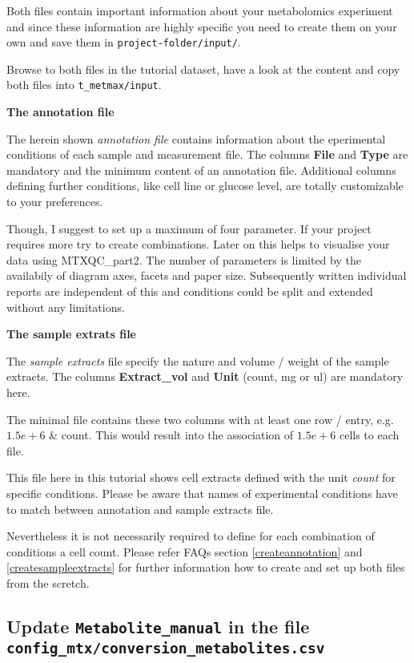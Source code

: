 \documentclass[]{book}
\begin{document}
Both files contain important information about your metabolomics experiment and since these information are highly specific you need to create them on your own and save them in \texttt{project-folder/input/}.

Browse to both files in the tutorial dataset, have a look at the content and copy both files into \texttt{t\_metmax/input}.

\textbf{The annotation file}

The herein shown \emph{annotation file} contains information about the eperimental conditions of each sample and measurement file. The columns \textbf{File} and \textbf{Type} are mandatory and the minimum content of an annotation file. Additional columns defining further conditions, like cell line or glucose level, are totally customizable to your preferences.

Though, I suggest to set up a maximum of four parameter. If your project requires more try to create combinations. Later on this helps to visualise your data using MTXQC\_part2. The number of parameters is limited by the availabily of diagram axes, facets and paper size. Subsequently written individual reports are independent of this and conditions could be split and extended without any limitations.

\textbf{The sample extrats file}

The \emph{sample extracts} file specify the nature and volume / weight of the sample extracts. The columns \textbf{Extract\_vol} and \textbf{Unit} (count, mg or ul) are mandatory here.

The minimal file contains these two columns with at least one row / entry, e.g. \(1.5e+6\) \& count. This would result into the association of \(1.5e+6\) cells to each file.

This file here in this tutorial shows cell extracts defined with the unit \emph{count} for specific conditions. Please be aware that names of experimental conditions have to match between annotation and sample extracts file.

Nevertheless it is not necessarily required to define for each combination of conditions a cell count. Please refer FAQs section \ref{createannotation} and \ref{createsampleextracts} for further information how to create and set up both files from the scretch.

\hypertarget{update-metabolite_manual-in-the-file-config_mtxconversion_metabolites.csv}{%
\subsection{\texorpdfstring{Update \texttt{Metabolite\_manual} in the file \texttt{config\_mtx/conversion\_metabolites.csv}}{Update Metabolite\_manual in the file config\_mtx/conversion\_metabolites.csv}}\label{update-metabolite_manual-in-the-file-config_mtxconversion_metabolites.csv}}
\end{document}
